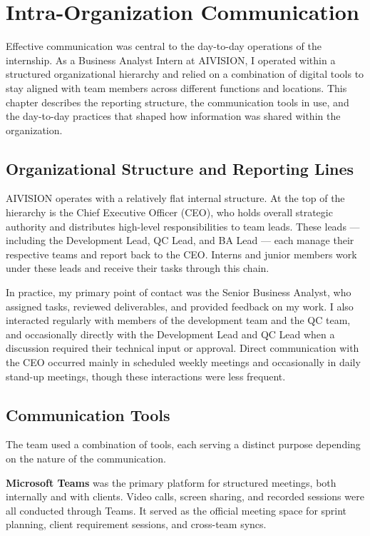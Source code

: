 \chapter{Intra-Organization Communication}
\label{chap:comms}

Effective communication was central to the day-to-day operations of the internship. As a Business Analyst Intern at AIVISION, I operated within a structured organizational hierarchy and relied on a combination of digital tools to stay aligned with team members across different functions and locations. This chapter describes the reporting structure, the communication tools in use, and the day-to-day practices that shaped how information was shared within the organization.

\section{Organizational Structure and Reporting Lines}

AIVISION operates with a relatively flat internal structure. At the top of the hierarchy is the Chief Executive Officer (CEO), who holds overall strategic authority and distributes high-level responsibilities to team leads. These leads — including the Development Lead, QC Lead, and BA Lead — each manage their respective teams and report back to the CEO. Interns and junior members work under these leads and receive their tasks through this chain.

In practice, my primary point of contact was the Senior Business Analyst, who assigned tasks, reviewed deliverables, and provided feedback on my work. I also interacted regularly with members of the development team and the QC team, and occasionally directly with the Development Lead and QC Lead when a discussion required their technical input or approval. Direct communication with the CEO occurred mainly in scheduled weekly meetings and occasionally in daily stand-up meetings, though these interactions were less frequent.

\section{Communication Tools}

The team used a combination of tools, each serving a distinct purpose depending on the nature of the communication.

\textbf{Microsoft Teams} was the primary platform for structured meetings, both internally and with clients. Video calls, screen sharing, and recorded sessions were all conducted through Teams. It served as the official meeting space for sprint planning, client requirement sessions, and cross-team syncs.

